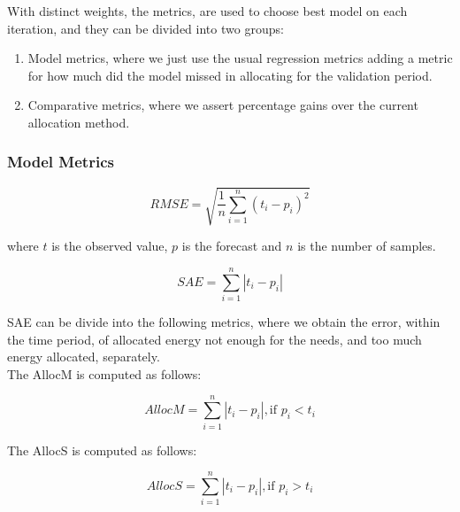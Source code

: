 
With distinct weights, the metrics, are used to choose best model on each iteration, and they can be divided into two groups:

\begin{enumerate}
\item Model metrics, where we just use the usual regression metrics adding a metric for how much did the model missed in allocating for the validation period.
\item Comparative metrics, where we assert percentage gains over the current allocation method. 
\end{enumerate} 

\subsubsection{Model Metrics}
\begin{linenomath}
    \begin{equation}\label{eq:rmse}
        RMSE = \sqrt{\frac{1}{n} \sum_{i=1}^{n}(t_i - p_i)^2}
    \end{equation}
    \end{linenomath}
		
		where $t$ is the observed value, $p$ is the forecast and $n$ is the number of samples.

\begin{linenomath}
    \begin{equation}\label{eq:SAE}
        SAE = \sum_{i=1}^{n}\left|t_i - p_i \right|
    \end{equation}
    \end{linenomath}

SAE can be divide into the following metrics, where we obtain the error, within the time period, of allocated energy not enough for the needs, and too much energy allocated, separately.\\

The \gls{AllocM} is computed as follows:
\begin{linenomath}
    \begin{equation}\label{eq:AllocM}
        AllocM = \sum_{i=1}^{n}\left|t_i - p_i \right| , \text{if } p_i < t_i
        \end{equation}
    \end{linenomath}

The \gls{AllocS} is computed as follows:

\begin{linenomath}
    \begin{equation}\label{eq:AllocS}
        AllocS = \sum_{i=1}^{n}\left|t_i - p_i \right| , \text{if } p_i > t_i
            \end{equation}
    \end{linenomath}
		
